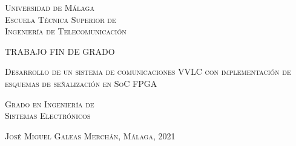 
\thispagestyle{empty}


	\begin{center}
		\Large \scshape
		Universidad de Málaga\\
		\bigskip
		Escuela Técnica Superior de\\
		Ingeniería de Telecomunicación
	\end{center}

	\bigskip


\bigskip

	\bigskip \bigskip \bigskip \bigskip

	\begin{center}
		\Large \scshape
		TRABAJO FIN DE GRADO
	\end{center}

	\bigskip \bigskip \bigskip \bigskip

	\begin{center}
		\huge \scshape
		Desarrollo de un sistema de comunicaciones VVLC con implementación de esquemas de 
		señalización en SoC FPGA
	\end{center}

	\vfill

	\begin{center}
		\Large \scshape
		Grado en Ingeniería de\\
		Sistemas Electrónicos
	\end{center}

	\bigskip \bigskip \bigskip \bigskip


	\begin{flushright}
		\large \scshape
		{José Miguel Galeas Merchán}, %
		Málaga, 2021%
	\end{flushright}



\blankpage
